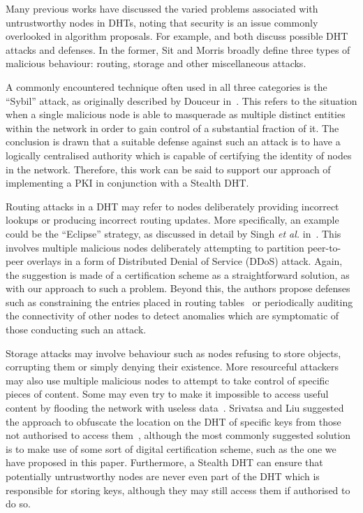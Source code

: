 \documentclass[times, 10pt,twocolumn]{article}
\begin{document}
\label{sect-related}

Many previous works have discussed the varied problems associated with
untrustworthy nodes in DHTs, noting that security is an issue commonly
overlooked in algorithm proposals. For example, \cite{Sit02Security}
and \cite{Castro02Secure} both discuss possible DHT attacks and
defenses. In the former, Sit and Morris broadly define three types of
malicious behaviour: routing, storage and other miscellaneous attacks.

A commonly encountered technique often used in all three categories is
the ``Sybil'' attack, as originally described by Douceur
in~\cite{Douceur02Sybil}. This refers to the situation when a single
malicious node is able to masquerade as multiple distinct entities
within the network in order to gain control of a substantial fraction
of it. The conclusion is drawn that a suitable defense against such an
attack is to have a logically centralised authority which is capable of
certifying the identity of nodes in the network. Therefore, this work
can be said to support our approach of implementing a PKI in
conjunction with a Stealth DHT.

Routing attacks in a DHT may refer to nodes deliberately providing
incorrect lookups or producing incorrect routing updates. More
specifically, an example could be the ``Eclipse'' strategy, as
discussed in detail by Singh \emph{et al.} in~\cite{Singh06Eclipse}.
This involves multiple malicious nodes deliberately attempting to
partition peer-to-peer overlays in a form of Distributed Denial of
Service (DDoS) attack. Again, the suggestion is made of a certification
scheme as a straightforward solution, as with our approach to such a
problem. Beyond this, the authors propose defenses such as constraining
the entries placed in routing tables~\cite{Castro02Secure} or
periodically auditing the connectivity of other nodes to detect
anomalies which are symptomatic of those conducting such an attack.

Storage attacks may involve behaviour such as nodes refusing to store
objects, corrupting them or simply denying their existence. More
resourceful attackers may also use multiple malicious nodes to attempt
to take control of specific pieces of content. Some may even try to
make it impossible to access useful content by flooding the network
with useless data~\cite{Liang06Index}. Srivatsa and Liu suggested the
approach to obfuscate the location on the DHT of specific keys from
those not authorised to access them~\cite{Srivatsa05Countering},
although the most commonly suggested solution is to make use of some
sort of digital certification scheme, such as the one we have proposed
in this paper. Furthermore, a Stealth DHT can ensure that potentially
untrustworthy nodes are never even part of the DHT which is responsible
for storing keys, although they may still access them if authorised to
do so.
\end{document}
